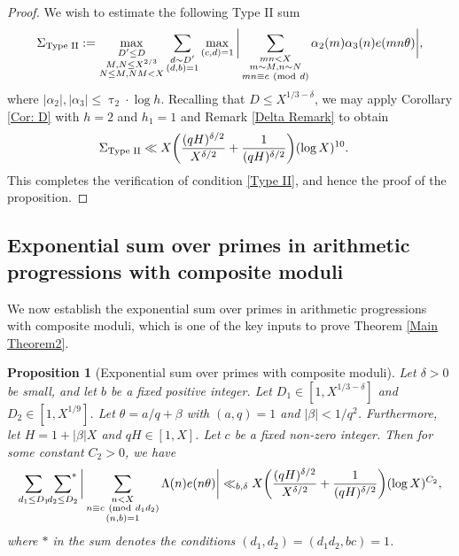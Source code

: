 \documentclass[12pt]{amsart}
\numberwithin{equation}{section}
\newtheorem{prop}[theorem]{Proposition}
\theoremstyle{remark}
\theoremstyle{definition}
\newcommand{\imod}[1]{\ (\mathrm{mod}\ #1)}
\begin{document}
\begin{proof}
 We wish to estimate the following Type II sum
\begin{align}\notag 
\Sigma_{\textup{Type II}}:=\max_{\substack{D'\leq D \\ M, N\leq X^{2/3}\\ N\leq M, NM<X}}\sum_{\substack{d\sim D'\\(d,b)=1}}\max_{(c, d)=1}\bigg|\sum_{\substack{mn<X\\ m\sim M, n\sim N \\mn\equiv c\imod d}}{\alpha}_2(m){\alpha}_3(n)e(mn\theta)\bigg|,
\end{align}
where $|\alpha_2|, |\alpha_3|\leq \uptau_2\cdot \log h$. Recalling that $D\leq X^{1/3-\delta}$, we may apply Corollary \ref{Cor: D} with $h=2$ and $h_1=1$ and Remark \ref{Delta Remark} to obtain
\begin{align}\notag 
\Sigma_{\textup{Type II}} &\ll X\bigg(\dfrac{(qH)^{\delta/2}}{X^{\delta/2}} + \dfrac{1}{(qH)^{\delta/2}}\bigg)(\log X)^{10}.
\end{align}
This completes the verification of condition \ref{Type II}, and hence the proof of the proposition.
\end{proof}











\subsection{Exponential sum over primes in arithmetic progressions with composite moduli}
We now establish the exponential sum over primes in arithmetic progressions with composite moduli, which is one of the key inputs to prove Theorem \ref{Main Theorem2}.

\begin{prop}[Exponential sum over primes with composite moduli]\label{PropminorPrimeII}
Let $\delta>0$ be small, and let $b$ be a fixed positive integer. Let $D_1\in [1, X^{1/3-\delta}]$ and $D_2\in [1, X^{1/9}]$. Let $\theta= a/q + \beta$ with $(a, q)=1$ and $|\beta|<1/q^2$. Furthermore, let $H=1+|\beta|X$ and $qH\in [1, X]$. Let $c$ be a fixed non-zero integer. Then for some constant $C_2>0$, we have
\begin{align}
\sum_{d_1\leq D_1}\sideset{}{^*}\sum_{\substack{d_2\leq D_2}}\bigg\lvert \sum_{\substack{n< X\\n \equiv c \imod {d_1d_2}\\(n, b)=1}}\Lambda(n)e(n\theta)\bigg\rvert \ll_{b, \delta}  X\bigg(\dfrac{(qH)^{\delta/2}}{X^{\delta/2}} + \dfrac{1}{(qH)^{\delta/2}}\bigg)(\log X)^{C_2},
 \end{align}
 where $*$ in the sum denotes the conditions $(d_1, d_2)=(d_1d_2, bc)=1$.
\end{prop}
\end{document}
